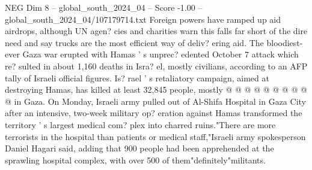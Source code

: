 \begin{textsample}{NEG Dim 8 – global\_south\_2024\_04 – Score -1.00 – global\_south\_2024\_04/107179714.txt}
Foreign powers have ramped up aid airdrops, although UN agen? cies and charities warn this falls far short of the dire need and say trucks are the most efficient way of deliv? ering aid.
The bloodiest-ever Gaza war erupted with Hamas ' s unprec? edented October 7 attack which re? sulted in about 1,160 deaths in Isra? el, mostly civilians, according to an AFP tally of Israeli official figures.
Is? rael ' s retaliatory campaign, aimed at destroying Hamas, has killed at least 32,845 people, mostly @ @ @ @ @ @ @ @ @ @ in Gaza.
On Monday, Israeli army pulled out of Al-Shifa Hospital in Gaza City after an intensive, two-week military op? eration against Hamas transformed the territory ' s largest medical com? plex into charred ruins."There are more terrorists in the hospital than patients or medical staff,"Israeli army spokesperson Daniel Hagari said, adding that 900 people had been apprehended at the sprawling hospital complex, with over 500 of them"definitely"militants.

\end{textsample}
